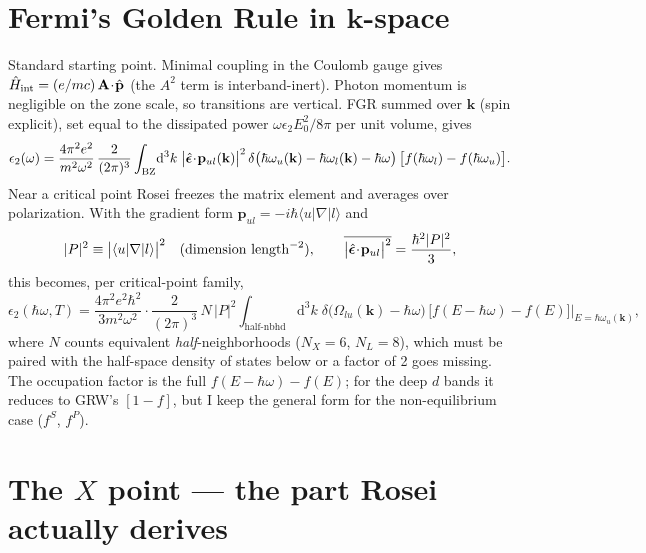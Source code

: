 \documentclass[11pt,a4paper]{article}
\numberwithin{equation}{section}
\newcommand{\hw}{\hbar\omega}
\newcommand{\dd}{\mathrm{d}}
\begin{document}
\section{Fermi's Golden Rule in $\mathbf k$-space}\label{sec:fgr}

Standard starting point. Minimal coupling in the Coulomb gauge gives
$\hat H_{\rm int}=(e/mc)\,\mathbf A\!\cdot\!\hat{\mathbf p}$ (the $A^2$
term is interband-inert). Photon momentum is negligible on the zone
scale, so transitions are vertical. FGR summed over $\mathbf k$ (spin
explicit), set equal to the dissipated power
$\omega\epsilon_2E_0^2/8\pi$ per unit volume, gives
\begin{equation}
\epsilon_2(\omega)=\frac{4\pi^2e^2}{m^2\omega^2}\,
\frac{2}{(2\pi)^3}\int_{\rm BZ}\!\dd^3k\;
\bigl|\hat{\bm\epsilon}\!\cdot\!\mathbf p_{ul}(\mathbf k)\bigr|^{2}
\,\delta\bigl(\hbar\omega_u(\mathbf k)-\hbar\omega_l(\mathbf k)-\hw\bigr)
\,\bigl[f(\hbar\omega_l)-f(\hbar\omega_u)\bigr].
\label{eq:eps2start}
\end{equation}
Near a critical point Rosei freezes the matrix element and averages
over polarization. With the gradient form
$\mathbf p_{ul}=-i\hbar\langle u|\nabla|l\rangle$ and
\begin{equation}
|P|^2\equiv\bigl|\langle u|\nabla|l\rangle\bigr|^2
\quad(\text{dimension }{\rm length}^{-2}),
\qquad
\overline{\bigl|\hat{\bm\epsilon}\!\cdot\!\mathbf p_{ul}\bigr|^2}
=\frac{\hbar^2|P|^2}{3},
\label{eq:Pconvention}
\end{equation}
this becomes, per critical-point family,
\begin{equation}
\epsilon_2(\hw,T)=\frac{4\pi^2e^2\hbar^2}{3m^2\omega^2}\cdot
\frac{2}{(2\pi)^3}\,N\,|P|^2
\int_{\text{half-nbhd}}\!\dd^3k\;
\delta\bigl(\Omega_{lu}(\mathbf k)-\hw\bigr)\,
\bigl[f(E-\hw)-f(E)\bigr]\Big|_{E=\hbar\omega_u(\mathbf k)} ,
\label{eq:eps2CP}
\end{equation}
where $N$ counts equivalent \emph{half}-neighborhoods ($N_X=6$,
$N_L=8$), which must be paired with the half-space density of states
below or a factor of 2 goes missing. The occupation factor is the full
$f(E-\hw)-f(E)$; for the deep $d$ bands it reduces to GRW's $[1-f]$,
but I keep the general form for the non-equilibrium case ($f^S$,
$f^P$).

\section{The $X$ point --- the part Rosei actually derives}\label{sec:X}
\end{document}
